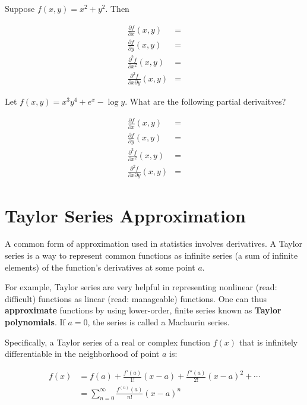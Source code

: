 \documentclass[]{book}
\theoremstyle{definition}
\theoremstyle{definition}
\theoremstyle{definition}
\theoremstyle{remark}
\begin{document}
Suppose \(f(x,y)=x^2+y^2\). Then

\begin{align*}
\frac{\partial f}{\partial x}(x,y) &=\\
\frac{\partial f}{\partial y}(x,y) &=\\
\frac{\partial^2 f}{\partial x^2}(x,y) &=\\
\frac{\partial^2 f}{\partial x \partial y}(x,y) &=
\end{align*}

\protect\hypertarget{exr:unnamed-chunk-19}{}{\label{exr:unnamed-chunk-19} }Let \(f(x,y)=x^3 y^4 +e^x -\log y\). What are the following partial derivaitves?

\begin{align*}
\frac{\partial f}{\partial x}(x,y) &=\\
\frac{\partial f}{\partial y}(x,y) &=\\
\frac{\partial^2 f}{\partial x^2}(x,y) &=\\
\frac{\partial^2 f}{\partial x \partial y}(x,y) &= 
\end{align*}

\hypertarget{taylorapprox}{%
\section{Taylor Series Approximation}\label{taylorapprox}}

A common form of approximation used in statistics involves derivatives. A Taylor series is a way to represent common functions as infinite series (a sum of infinite elements) of the function's derivatives at some point \(a\).

For example, Taylor series are very helpful in representing nonlinear (read: difficult) functions as linear (read: manageable) functions. One can thus \textbf{approximate} functions by using lower-order, finite series known as \textbf{Taylor polynomials}. If \(a=0\), the series is called a Maclaurin series.

Specifically, a Taylor series of a real or complex function \(f(x)\) that is infinitely differentiable in the neighborhood of point \(a\) is:

\begin{align*}
    f(x) &= f(a) + \frac{f'(a)}{1!} (x-a) +  \frac{f''(a)}{2!} (x-a)^2 + \cdots\\
     &= \sum_{n=0}^\infty \frac{f^{(n)} (a)}{n!} (x-a)^n
\end{align*}
\end{document}
